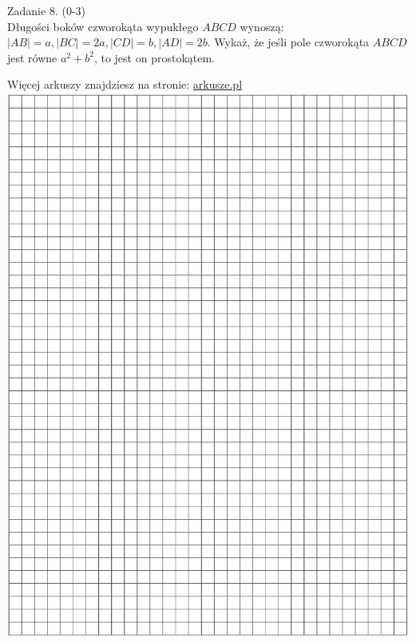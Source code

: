 \documentclass[10pt]{article}
\begin{document}
Zadanie 8. (0-3)\\
Długości boków czworokąta wypukłego \(A B C D\) wynoszą: \(|A B|=a,|B C|=2 a,|C D|=b,|A D|=2 b\). Wykaż, że jeśli pole czworokąta \(A B C D\) jest równe \(a^{2}+b^{2}\), to jest on prostokątem.

Więcej arkuszy znajdziesz na stronie: \href{http://arkusze.pl}{arkusze.pl}\\
\includegraphics[max width=\textwidth, center]{2024_11_21_5abc0108fbbc287103ecg-06}
\end{document}

